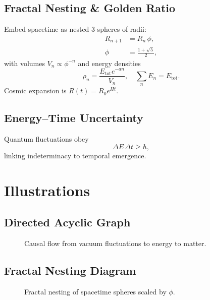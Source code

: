 \documentclass[%
  prd,
  twocolumn,
  10pt,
  nofootinbib,
  tightenlines,
  showkeys
]{revtex4-2}
\begin{document}
\subsection{Fractal Nesting \& Golden Ratio}
Embed spacetime as nested 3-spheres of radii:
\begin{subequations}
\begin{align}
  R_{n+1} &= R_n\,\phi,\\
  \phi     &= \frac{1+\sqrt5}{2},
\end{align}
\end{subequations}
with volumes $V_n\propto\phi^{-n}$ and energy densities
\[
  \rho_n=\frac{E_\text{tot}e^{-a n}}{V_n},\quad
  \sum_n E_n = E_\text{tot}.
\]
Cosmic expansion is $R(t)=R_0 e^{H t}$.

\subsection{Energy–Time Uncertainty}
Quantum fluctuations obey
\[
  \Delta E\,\Delta t \ge \hbar,
\]
linking indeterminacy to temporal emergence.

\section{Illustrations}\label{sec:figs}

\subsection{Directed Acyclic Graph}
\begin{figure}[htbp]
  \centering
  \caption{Causal flow from vacuum fluctuations to energy to matter.}
  \label{fig:dag}
\end{figure}

\subsection{Fractal Nesting Diagram}
\begin{figure}[htbp]
  \centering
  \caption{Fractal nesting of spacetime spheres scaled by $\phi$.}
  \label{fig:fractal}
\end{figure}
\end{document}
